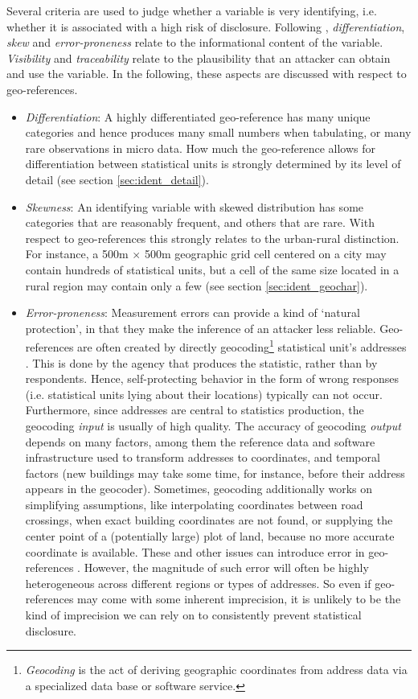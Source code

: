 Several criteria are used to judge whether a variable is very identifying, i.e. whether it is associated with a high risk of disclosure. Following \cite{ElliotDale1999}, \emph{differentiation}, \emph{skew} and \emph{error-proneness} relate to the informational content of the variable. \emph{Visibility} and \emph{traceability} \citep[~p.52]{WillenborgDeWaal1996} relate to the plausibility that an attacker can obtain and use the variable. In the following, these aspects are discussed with respect to geo-references.
\begin{itemize}
    \item \emph{Differentiation}: A highly differentiated geo-reference has many unique categories and hence produces many small numbers when tabulating, or many rare observations in micro data. How much the geo-reference allows for differentiation between statistical units is strongly determined by its level of detail (see section \ref{sec:ident_detail}).
    \item \emph{Skewness}: An identifying variable with skewed distribution has some categories that are reasonably frequent, and others that are rare. With respect to geo-references this strongly relates to the urban-rural distinction. For instance, a 500m $\times$ 500m geographic grid cell centered on a city may contain hundreds of statistical units, but a cell of the same size located in a rural region may contain only a few (see section \ref{sec:ident_geochar}).
    \item \emph{Error-proneness}: Measurement errors can provide a kind of `natural protection', in that they make the inference of an attacker less reliable. Geo-references are often created by directly geocoding\footnote{
        \emph{Geocoding} is the act of deriving geographic coordinates from address data via a specialized data base or software service.} 
    statistical unit's addresses \citep{HaldorsonMostrom2019}. This is done by the agency that produces the statistic, rather than by respondents. Hence, self-protecting behavior in the form of wrong responses (i.e. statistical units lying about their locations) typically can not occur. Furthermore, since addresses are central to statistics production, the geocoding \emph{input} is usually of high quality. The accuracy of geocoding \emph{output} depends on many factors, among them the reference data and software infrastructure used to transform addresses to coordinates, %
    and temporal factors (new buildings may take some time, for instance, before their address appears in the geocoder). Sometimes, geocoding additionally works on simplifying assumptions, like interpolating coordinates between road crossings, when exact building coordinates are not found, or supplying the center point of a (potentially large) plot of land, because no more accurate coordinate is available. These and other issues can introduce error in geo-references \citep{OwusuEtAl2017, GrubesicMurray2004}. However, the magnitude of such error will often be highly heterogeneous across different regions or types of addresses. So even if geo-references may come with some inherent imprecision, it is unlikely to be the kind of imprecision we can rely on to consistently prevent statistical disclosure.

\end{itemize}
